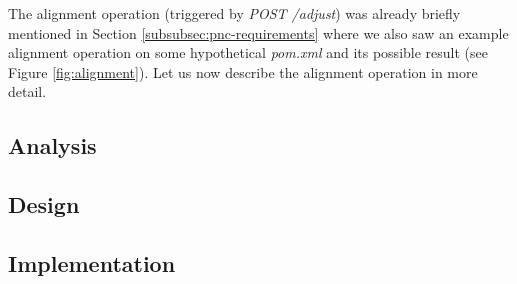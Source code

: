 \documentclass[../main.tex]{subfiles}
\begin{document}
The alignment operation (triggered by \textit{POST /adjust}) was already briefly mentioned in Section \ref{subsubsec:pnc-requirements} where we also saw an example alignment operation on some hypothetical \textit{pom.xml} and its possible result (see Figure \ref{fig:alignment}). Let us now describe the alignment operation in more detail.

\subsection{Analysis}


\subsection{Design}
\label{subsec:alignment-design}


\subsection{Implementation}

\end{document}
